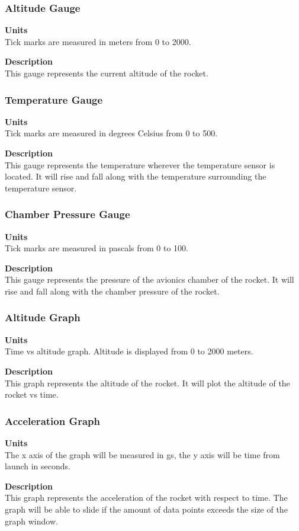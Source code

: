 \documentclass[10pt,draftclsnofoot,onecolumn,compsoc]{IEEEtran}
\begin{document}
\subsubsection{Altitude Gauge}
{\bf Units} \\ Tick marks are measured in meters from 0 to 2000.\par
{\bf Description} \\ This gauge represents the current altitude of the rocket.\par

\subsubsection{Temperature Gauge}
{\bf Units} \\ Tick marks are measured in degrees Celsius from 0 to 500.\par
{\bf Description} \\ This gauge represents the temperature wherever the temperature sensor is located. It will rise and fall along with the temperature surrounding the temperature sensor.\par

\subsubsection{Chamber Pressure Gauge}
{\bf Units} \\ Tick marks are measured in pascals from 0 to 100.\par
{\bf Description} \\ This gauge represents the pressure of the avionics chamber of the rocket. It will rise and fall along with the chamber pressure of the rocket. \par

\subsubsection{Altitude Graph}
{\bf Units} \\ Time vs altitude graph. Altitude is displayed from 0 to 2000 meters.\par
{\bf Description} \\ This graph represents the altitude of the rocket. It will plot the altitude of the rocket vs time. \par

\subsubsection{Acceleration Graph}
{\bf Units} \\ The x axis of the graph will be measured in gs, the y axis will be time from launch in seconds.\par
{\bf Description} \\ This graph represents the acceleration of the rocket with respect to time. The graph will be able to slide if the amount of data points exceeds the size of the graph window. \par
\end{document}
